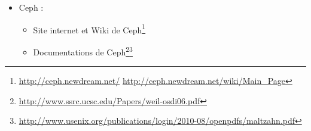 \documentclass[12pt]{report}
\begin{document}
\begin{itemize}
\begin{itemize}
					\footnote{\href{http://www.moosefs.org/tl_files/manpageszip/moosefs-step-by-step-tutorial-v.1.1.pdf}
					{http://www.moosefs.org/tl\_files/manpageszip/moosefs-step-by-step-tutorial-v.1.1.pdf}}
				\end{itemize}
				\item Ceph : 
				  \begin{itemize}
				  \item Site internet et Wiki de Ceph\footnote{\href{http://ceph.newdream.net/}{http://ceph.newdream.net/} \href{http://ceph.newdream.net/wiki/Main\_Page}{http://ceph.newdream.net/wiki/Main\_Page}}
				  \item Documentations de Ceph\footnote{\href{http://www.ssrc.ucsc.edu/Papers/weil-osdi06.pdf}{http://www.ssrc.ucsc.edu/Papers/weil-osdi06.pdf}}\footnote{\href{http://www.usenix.org/publications/login/2010-08/openpdfs/maltzahn.pdf}{http://www.usenix.org/publications/login/2010-08/openpdfs/maltzahn.pdf}}
				  \end{itemize}
			\end{itemize}
\end{document}
